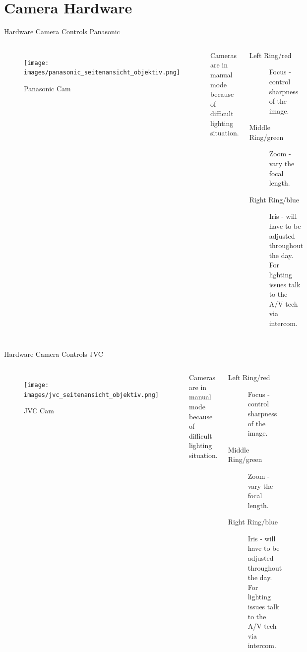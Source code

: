 \documentclass[aspectratio=169]{beamer}
\begin{document}



\section{Camera Hardware}
\begin{frame}{Hardware Camera Controls Panasonic}
	\begin{columns}[T,onlytextwidth]
	\begin{figure} 
		\centering
		\texttt{[image: images/panasonic\_seitenansicht\_objektiv.png]}
		\caption{Panasonic Cam}
	\end{figure}
		Cameras are in manual mode because of difficult lighting situation.
		\begin{description}
			\item[Left Ring/red] Focus - control sharpness of the image.
			\item[Middle Ring/green] Zoom - vary the focal length.
			\item[Right Ring/blue] Iris - will have to be adjusted throughout the day. For lighting issues talk to the A/V tech via intercom.
		\end{description}
	\end{columns}
\end{frame}

\begin{frame}{Hardware Camera Controls JVC}
	\begin{columns}[T,onlytextwidth]
	\begin{figure} 
		\centering
		\texttt{[image: images/jvc\_seitenansicht\_objektiv.png]}
		\caption{JVC Cam}
	\end{figure}
		Cameras are in manual mode because of difficult lighting situation.
		\begin{description}
			\item[Left Ring/red] Focus - control sharpness of the image.
			\item[Middle Ring/green] Zoom - vary the focal length.
			\item[Right Ring/blue] Iris - will have to be adjusted throughout the day. For lighting issues talk to the A/V tech via intercom.
		\end{description}
	\end{columns}
\end{frame}
\end{document}
